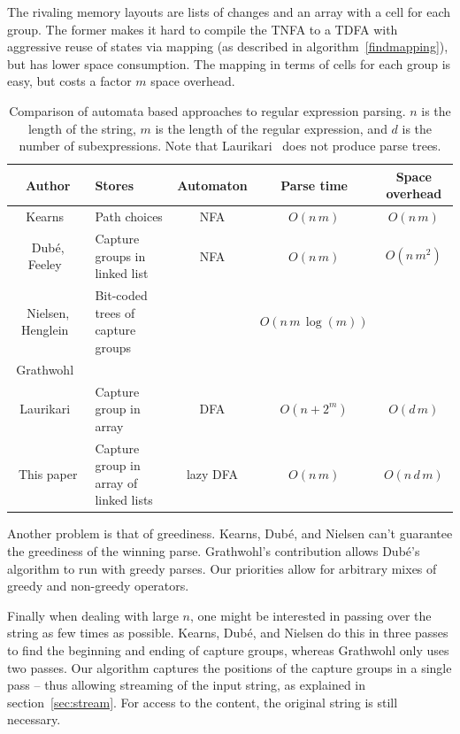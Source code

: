 \documentclass[11pt,a4paper,twoside,openright]{Thesis}
\theoremstyle{definition}
\begin{document}
The rivaling memory layouts are lists of changes and an array with a cell for
each group. The former makes it hard to compile the TNFA to a TDFA with
aggressive reuse of states via mapping (as described in
algorithm~\ref{findmapping}), but has lower space consumption. The mapping in
terms of cells for each group is easy, but costs a factor $m$ space overhead.

\begin{table}
\begin{tabular}{c|>{\centering}m{3cm}ccc}
  Author & Stores & Automaton & Parse time & Space overhead \\
  \hline
  \hline
  Kearns~\cite{Kear91a}& Path choices & NFA & $O(n\,m)$ & $O(n\, m)$ \\
  \hline
  Dub\'e, Feeley~\cite{Dube00a}& Capture groups in linked
  list & NFA & $O(n\,m)$ & $O(n\, m^2)$\\
  Nielsen, Henglein~\cite{Niel11a} & Bit-coded trees of capture groups  & & $O(n\, m\, \log(m))$ \\
  Grathwohl~\cite{Grat13a} \\
  \hline
  Laurikari~\cite{Laur00a}& Capture group in array & DFA &
  $O(n+2^m)$ & $O(d\, m)$\\
  This paper & Capture group in array of linked lists & lazy DFA
  & $O(n\, m)$ & $O(n\, d\, m)$ \\
\end{tabular}
\caption{Comparison of automata based approaches to regular expression
parsing. $n$ is the length of the string, $m$ is the length of the regular
expression, and $d$ is the number of subexpressions. Note that
Laurikari~\cite{Laur00a} does not produce parse trees.}
\end{table}

Another problem is that of greediness. Kearns, Dub\'e, and Nielsen can't
guarantee the greediness of the winning parse. Grathwohl's contribution
allows Dub\'e's algorithm to run with greedy parses. Our priorities allow for
arbitrary mixes of greedy and non-greedy operators.

Finally when dealing with large $n$, one might be interested in passing over
the string as few times as possible. Kearns, Dub\'e, and Nielsen do this in
three passes to find the beginning and ending of capture groups, whereas
Grathwohl only uses two passes. Our algorithm captures the positions of the
capture groups in a single pass -- thus allowing streaming of the input
string, as explained in section~\ref{sec:stream}. For access to the content,
the original string is still necessary.
\end{document}
